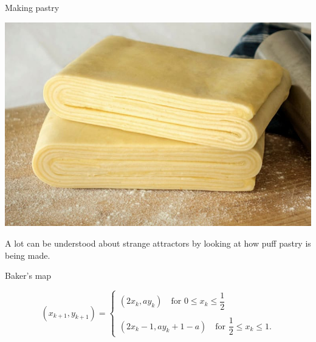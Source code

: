 \documentclass[usenames, dvipsnames, aspectratio=169]{beamer}
\begin{document}
\begin{frame}[t, c]{Making pastry}{}
  \vfill
  \large

  \begin{minipage}{.48\textwidth}
    \centering
    \includegraphics[width=\textwidth]{puff_pastry}
  \end{minipage}%
  \hfill
  \begin{minipage}{.48\textwidth}
    A lot can be understood about strange attractors by looking at how puff pastry is being made.
  \end{minipage}

  \vfill
\end{frame}

\begin{frame}[t, c]{Baker's map}{}
  \vfill
  \large

  \[
  \left(x_{k+1}, y_{k+1} \right)
  =
  \begin{cases}
    \left(2 x_k, a y_k \right) \quad \textrm{for } 0 \leq x_k \leq \dfrac{1}{2} \\
    \\
    \left(2 x_k - 1, ay_k + 1 - a \right) \quad \textrm{for } \dfrac{1}{2} \leq x_k \leq 1.
  \end{cases}
  \]

  \vfill
\end{frame}
\end{document}
